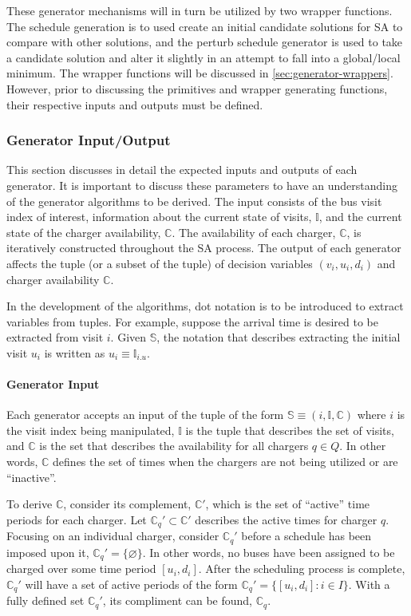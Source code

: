 \documentclass[11pt,a4paper,final]{article}
\newcommand{\I}{\mathbb{I}}                 %
\newcommand{\C}{\mathbb{C}}                 %
\newcommand{\Sol}{\mathbb{S}}               %
\newcommand{\Qset}{Q}                       %
\begin{document}
These generator mechanisms will in turn be utilized by two wrapper functions. The schedule generation is to used create
an initial candidate solutions for SA to compare with other solutions, and the perturb schedule generator is used to
take a candidate solution and alter it slightly in an attempt to fall into a global/local minimum. The wrapper functions
will be discussed in \ref{sec:generator-wrappers}. However, prior to discussing the primitives and wrapper generating
functions, their respective inputs and outputs must be defined.

\subsubsection{Generator Input/Output}
\label{sec:generator-input-output}
This section discusses in detail the expected inputs and outputs of each generator. It is important to discuss these
parameters to have an understanding of the generator algorithms to be derived. The input consists of the bus visit index
of interest, information about the current state of visits, \(\I\), and the current state of the charger availability,
\(\C\). The availability of each charger, \(\C\), is iteratively constructed throughout the SA process. The output of each
generator affects the tuple (or a subset of the tuple) of decision variables \((v_i, u_i, d_i)\) and charger availability
\(\C\).

In the development of the algorithms, dot notation is to be introduced to extract variables from tuples. For example,
suppose the arrival time is desired to be extracted from visit \(i\). Given \(\Sol\), the notation that describes extracting
the initial visit \(u_i\) is written as \(u_i \equiv \I_{i.u}\).

\paragraph{Generator Input}
\label{sec:org3fc050b}
Each generator accepts an input of the tuple of the form \(\Sol \equiv (i, \I, \C)\) where \(i\) is the visit index being
manipulated, \(\I\) is the tuple that describes the set of visits, and \(\C\) is the set that describes the availability for
all chargers \(q \in \Qset\). In other words, \(\C\) defines the set of times when the chargers are not being utilized or are
``inactive''.

To derive \(\C\), consider its complement, \(\C'\), which is the set of ``active'' time periods for each charger. Let \(\C_q' \subset
\C'\) describes the active times for charger \(q\). Focusing on an individual charger, consider \(\C_q'\) before a schedule
has been imposed upon it, \(\C_q' = \{ \varnothing \}\). In other words, no buses have been assigned to be charged over
some time period \([u_i, d_i]\). After the scheduling process is complete, \(\C_q'\) will have a set of active periods of
the form \(\C_q' = \{[u_i, d_i]: i \in I\}\). With a fully defined set \(\C_q'\), its compliment can be found, \(\C_q\).
\end{document}
